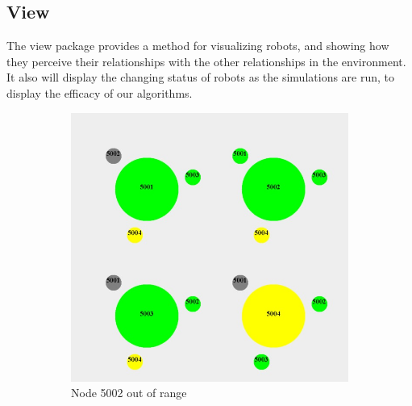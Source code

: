 \documentclass[10pt,letterpaper]{article}
\begin{document}
\subsection{View}
The view package provides a method for visualizing robots, and showing how they perceive their relationships with the other relationships in the environment. It also will display the changing status of robots as the simulations are run, to display the efficacy of our algorithms.        
        \begin{figure}[!t]
            \centering
            \begin{subfigure}{0.475\textwidth}
                \centering
                \includegraphics[width=\textwidth]{images/peers_and_leader.jpeg}
                \caption{Node 5002 out of range}
                \label{img:subA}
            \end{subfigure}
            \begin{subfigure}{0.475\textwidth}
                \centering

\end{subfigure}
\end{figure}
\end{document}
